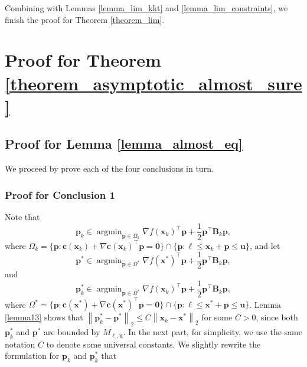 \documentclass[aos]{imsart}
\numberwithin{equation}{section}
\theoremstyle{plain}
\begin{document}
\begin{appendix}
Combining with Lemmas \ref{lemma_lim_kkt} and \ref{lemma_lim_constraints}, we finish the proof for Theorem \ref{theorem_lim}.


\newpage
\section{Proof for Theorem \ref{theorem_asymptotic_almost_sure}}
\subsection{Proof for Lemma \ref{lemma_almost_eq}}
We proceed by prove each of the four conclusions in turn. 

\subsubsection{Proof for Conclusion 1} 
Note that 
    \begin{equation*}
            \bm{p}_{k} \in \mathop{\arg \min}_{\bm{p} \in \Omega_{k}} \nabla f(\bm{x}_{k})^{\top} \bm{p} + \frac{1}{2} \bm{p}^{\top} \bm{B}_{k} \bm{p},
    \end{equation*}
    where $\Omega_k = \{\bm{p}: \bm{c}(\bm{x}_k)+\nabla \bm{c}(\bm{x}_k)^{\top}\bm{p} = \bm{0}\} \cap \{\bm{p}: \bm{\ell} \leq \bm{x}_k + \bm{p} \leq \bm{u}\} $, and let
    \begin{equation*}
        \bm{p}^{*} \in \mathop{\arg \min}_{\bm{p} \in \Omega^{*}} \nabla f(\bm{x}^{*})^{\top} \bm{p} + \frac{1}{2} \bm{p}^{\top} \bm{B}_{k} \bm{p},
    \end{equation*}
    and
    \begin{equation*}
        \bm{p}_{k}^{*} \in \mathop{\arg \min}_{\bm{p} \in \Omega^{*}} \nabla f(\bm{x}_{k})^{\top} \bm{p} + \frac{1}{2} \bm{p}^{\top} \bm{B}_{k} \bm{p},
    \end{equation*}
    where $\Omega^{*} = \{\bm{p}: \bm{c}(\bm{x}^{*})+\nabla \bm{c}(\bm{x}^{*})^{\top}\bm{p} = \bm{0}\} \cap \{\bm{p}: \bm{\ell} \leq \bm{x}^{*} + \bm{p} \leq \bm{u}\} $. Lemma \ref{lemma13} shows that $\left\| \bm{p}_{k}^{*} - \bm{p}^{*} \right\|_2 \leq C \left\| \bm{x}_{k} - \bm{x}^{*} \right\|_2$ for some $C > 0$, since both $\bm{p}_{k}^{*} $ and $\bm{p}^{*}$ are bounded by $M_{\bm{\ell}, \bm{u}}$. In the next part, for simplicity, we use the same notation $C$ to denote some universal constants. We slightly rewrite the formulation for $\bm{p}_{k}$ and $\bm{p}_{k}^{*} $ that

\end{appendix}
\end{document}
